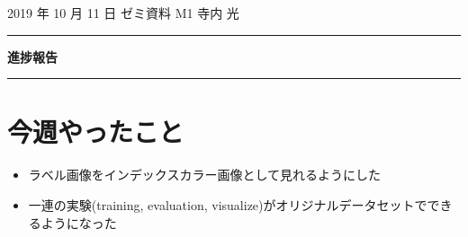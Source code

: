 \documentclass[onecolumn]{ujarticle}   %
\begin{document}
	
	\noindent
	
	\hspace{1em}
	2019 年 10 月 11 日
	ゼミ資料
	\hfill
	M1 寺内 光
	
	\vspace{2mm}
	
	\hrule
	
	\begin{center}
		{\Large \bf 進捗報告}
	\end{center}
	
	
	\hrule
	\vspace{3mm}
	
	\section{今週やったこと}
	\begin{itemize}
		\item ラベル画像をインデックスカラー画像として見れるようにした
		\item 一連の実験(training, evaluation, visualize)がオリジナルデータセットでできるようになった
	\end{itemize}
\end{document}
